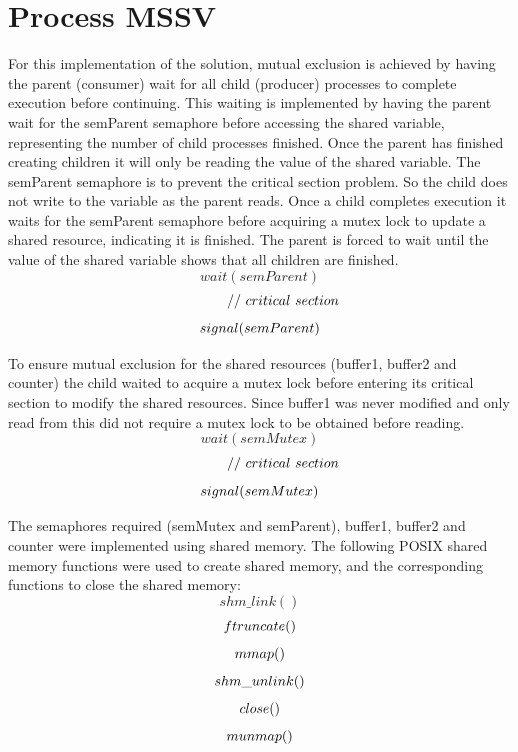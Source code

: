 \documentclass[]{article}
\begin{document}
\section{Process MSSV}
For this implementation of the solution, mutual exclusion is achieved by having the parent (consumer) wait for all child (producer) processes to complete execution before continuing. This waiting is implemented by having the parent wait for the semParent semaphore before accessing the shared variable, representing the number of child processes finished. Once the parent has finished creating children it will only be reading the value of the shared variable. The semParent semaphore is to prevent the critical section problem. So the child does not write to the variable as the parent reads. Once a child completes execution it waits for the semParent semaphore before acquiring a mutex lock to update a shared resource, indicating it is finished. The parent is forced to wait until the value of the shared variable shows that all children are finished. 
$$
wait(semParent)
$$
$$
\ \ \ \ \ \ \ \ \ \ //\ critical\ section\\ 
$$
$$
signal(semParent)\\ \\
$$
\vspace{0.1cm}

To ensure mutual exclusion for the shared resources (buffer1, buffer2 and counter) the child waited to acquire a mutex lock before entering its critical section to modify the shared resources. Since buffer1 was never modified and only read from this did not require a mutex lock to be obtained before reading. \\
$$
wait(semMutex)
$$
$$
\ \ \ \ \ \ \ \ \ \ //\ critical\ section\\ 
$$
$$
signal(semMutex)\\ \\
$$
\vspace{0.1cm}

The semaphores required (semMutex and semParent), buffer1, buffer2 and counter were implemented using shared memory. The following POSIX shared memory functions were used to create shared memory, and the corresponding functions to close the shared memory: \\
$$
shm\_link()
$$
$$
ftruncate()\\
$$
$$
mmap()\\ 
$$
$$
shm\_unlink() \\
$$
$$
close()\\
$$
$$
munmap()\\ 
$$
	
\end{document}
